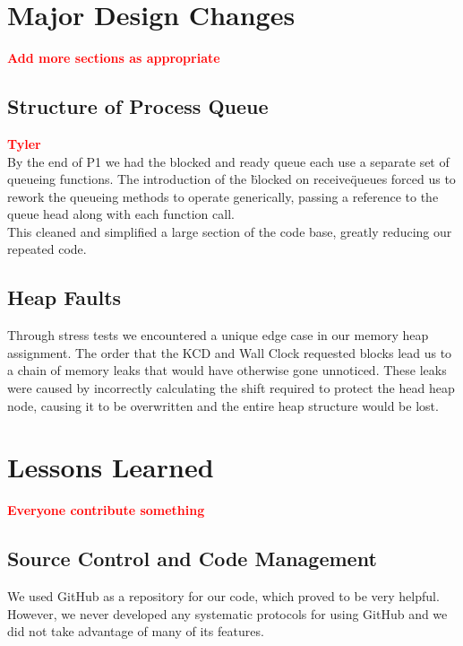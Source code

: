 \documentclass[12pt]{report}
\begin{document}
\chapter{Major Design Changes}

\textcolor{red}{\textbf{Add more sections as appropriate}} \\

\section{Structure of Process Queue}

\textcolor{red}{\textbf{Tyler}} \\
By the end of P1 we had the blocked and ready queue each use a separate set of queueing functions. The introduction of the \"blocked on receive\" queues forced us to rework the queueing methods to operate generically, passing a reference to the queue head along with each function call.\\
This cleaned and simplified a large section of the code base, greatly reducing our repeated code.\\

\section{Heap Faults}
Through stress tests we encountered a unique edge case in our memory heap assignment. The order that the KCD and Wall Clock requested blocks lead us to a chain of memory leaks that would have otherwise gone unnoticed. These leaks were caused by incorrectly calculating the shift required to protect the head heap node, causing it to be overwritten and the entire heap structure would be lost.




\chapter{Lessons Learned}

\textcolor{red}{\textbf{Everyone contribute something}} \\

\section{Source Control and Code Management}

We used GitHub as a repository for our code, which proved to be very helpful. However, we never developed any systematic protocols for using GitHub and we did not take advantage of many of its features.\\
\end{document}
